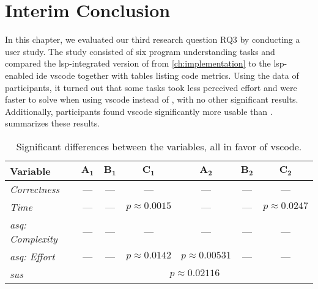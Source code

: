 \documentclass[../thesis]{subfiles}
\begin{document}
\section{Interim Conclusion}
In this chapter, we evaluated our third research question \textsf{RQ3} by conducting a user study.
The study consisted of six program understanding tasks and compared the \gls{lsp}-integrated version of \SEE{} from \cref{ch:implementation} to the \gls{lsp}-enabled \gls{ide} \gls{vscode} together with tables listing code metrics.
Using the data of \participants participants, it turned out that some tasks took less perceived effort and were faster to solve when using \gls{vscode} instead of \SEE{}, with no other significant results.
Additionally, participants found \gls{vscode} significantly more usable than \SEE{}.
 summarizes these results.

\begin{table*}[htbp]
	\caption{Significant differences between the variables, all in favor of \gls{vscode}.}\label{tab:results}
	\centering
	\begin{tabular}{@{}lcccccc@{}}
		\toprule
		\textbf{Variable}            & $\bm{A_1}$                              & $\bm{B_1}$ & $ \bm{C_1}$        & $\bm{A_2}$          & $\bm{B_2}$ & $\bm{C_2}$         \\\midrule
		\emph{Correctness}           & ---                                     & ---        & ---                & ---                 & ---        & ---                \\
		\emph{Time}                  & ---                                     & ---        & $p \approx 0.0015$ & ---                 & ---        & $p \approx 0.0247$ \\
		\emph{\gls{asq}: Complexity} & ---                                     & ---        & ---                & ---                 & ---        & ---                \\
		\emph{\gls{asq}: Effort}     & ---                                     & ---        & $p \approx 0.0142$ & $p \approx 0.00531$ & ---        & ---                \\
		\emph{\gls{sus}}             & \multicolumn{6}{c}{$p \approx 0.02116$}                                                                                           \\
		\bottomrule
	\end{tabular}
\end{table*}
\end{document}
